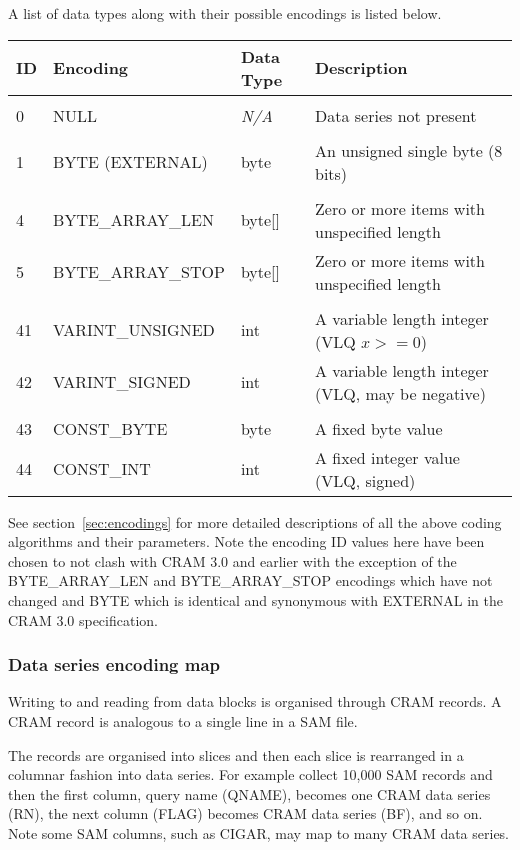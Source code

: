 \documentclass[a4paper]{article}
\begin{document}
A list of data types along with their possible encodings is listed
below.

\begin{tabular}{llll}
\textbf{ID}  & \textbf{Encoding} & \textbf{Data Type} & \textbf{Description}\\
\hline
\\
0  & NULL             & \textit{N/A} & Data series not present\\
\\
1  & BYTE (EXTERNAL)  & byte   & An unsigned single byte (8 bits)  \\
\\
4  & BYTE\_ARRAY\_LEN & byte[] & Zero or more items with unspecified length\\
5  & BYTE\_ARRAY\_STOP& byte[] & Zero or more items with unspecified length\\
\\
41 & VARINT\_UNSIGNED & int    & A variable length integer (VLQ $x >= 0$)\\
42 & VARINT\_SIGNED   & int    & A variable length integer (VLQ, may be negative)\\
\\
43 & CONST\_BYTE      & byte   & A fixed byte value\\
44 & CONST\_INT       & int    & A fixed integer value (VLQ, signed)\\
\end{tabular}

\vskip 10pt

See section~\ref{sec:encodings} for more detailed descriptions of all
the above coding algorithms and their parameters.  Note the encoding
ID values here have been chosen to not clash with CRAM 3.0 and earlier
with the exception of the BYTE\_ARRAY\_LEN and BYTE\_ARRAY\_STOP
encodings which have not changed and BYTE which is identical and
synonymous with EXTERNAL in the CRAM 3.0 specification.

\subsubsection{Data series encoding map}

Writing to and reading from data blocks is organised through CRAM
records. A CRAM record is analogous to a single line in a SAM file.

The records are organised into slices and then each slice is
rearranged in a columnar fashion into data series.  For example
collect 10,000 SAM records and then the first column, query name
(QNAME), becomes one CRAM data series (RN), the next column (FLAG)
becomes CRAM data series (BF), and so on.  Note some SAM columns, such
as CIGAR, may map to many CRAM data series.
\end{document}
